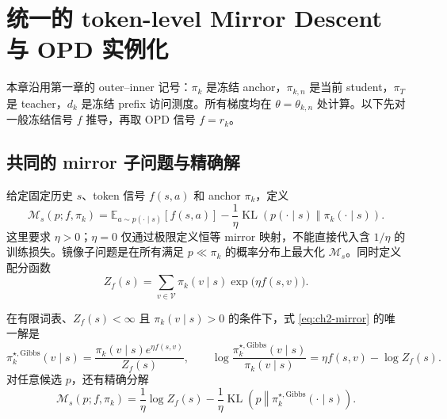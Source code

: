 \chapter{统一的 token-level Mirror Descent 与 OPD 实例化}
\label{ch:four-methods}

本章沿用第一章的 outer--inner 记号：$\pi_k$ 是冻结 anchor，$\pi_{k,n}$ 是当前 student，$\pi_T$ 是 teacher，$d_k$ 是冻结 prefix 访问测度。所有梯度均在 $\theta=\theta_{k,n}$ 处计算。以下先对一般冻结信号 $f$ 推导，再取 OPD 信号 $f=r_k$。

\section{共同的 mirror 子问题与精确解}
\label{sec:ch2-common}

\begin{definition}
\label{def:ch2-mirror-subproblem}
给定固定历史 $s$、token 信号 $f(s,a)$ 和 anchor $\pi_k$，定义
\begin{equation}
\label{eq:ch2-mirror}
\mathcal M_s(p;f,\pi_k)
=\mathbb E_{a\sim p(\cdot\mid s)}[f(s,a)]
-\frac1\eta\operatorname{KL}\!\left(p(\cdot\mid s)\middle\Vert\pi_k(\cdot\mid s)\right).
\end{equation}
这里要求 $\eta>0$；$\eta=0$ 仅通过极限定义恒等 mirror 映射，不能直接代入含 $1/\eta$ 的训练损失。镜像子问题是在所有满足 $p\ll\pi_k$ 的概率分布上最大化 $\mathcal M_s$。同时定义配分函数
\begin{equation}
\label{eq:ch2-mirror-normalizer}
Z_f(s)=\sum_{v\in\mathcal V}\pi_k(v\mid s)\exp\!\bigl(\eta f(s,v)\bigr).
\end{equation}
\end{definition}

\begin{theorem}
\label{thm:ch2-gibbs}
在有限词表、$Z_f(s)<\infty$ 且 $\pi_k(v\mid s)>0$ 的条件下，式 \eqref{eq:ch2-mirror} 的唯一解是
\begin{equation}
\label{eq:ch2-optimal-policy}
\pi_k^{\star,\mathrm{Gibbs}}(v\mid s)=\frac{\pi_k(v\mid s)e^{\eta f(s,v)}}{Z_f(s)},
\qquad
\log\frac{\pi_k^{\star,\mathrm{Gibbs}}(v\mid s)}{\pi_k(v\mid s)}
=\eta f(s,v)-\log Z_f(s).
\end{equation}
对任意候选 $p$，还有精确分解
\begin{equation}
\label{eq:ch2-kl-decomp}
\mathcal M_s(p;f,\pi_k)
=\frac1\eta\log Z_f(s)
-\frac1\eta\operatorname{KL}\!\left(p\middle\Vert\pi_k^{\star,\mathrm{Gibbs}}(\cdot\mid s)\right).
\end{equation}
\end{theorem}

